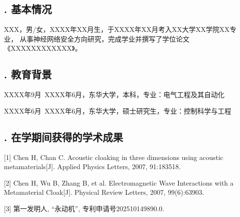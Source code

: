 
\begin{resume}
\subsection*{. 基本情况}

XXX，男/女，XXXX年XX月生，于XXXX年XX月考入XX大学XX学院XX专业，
从事神经网络安全方向研究，完成学业并撰写了学位论文《XXXXXXXXXXXX》。

\subsection*{. 教育背景}

XXXX年9月~XXXX年6月，东华大学，本科，专业：电气工程及其自动化

XXXX年6月~XXXX年6月，东华大学，硕士研究生，专业：控制科学与工程

\subsection*{. 在学期间获得的学术成果}

[1] Chen H, Chan C. Acoustic cloaking in three dimensions using acoustic metamaterials[J]. Applied Physics Letters, 2007, 91:183518.

[2] Chen H, Wu B, Zhang B, et al. Electromagnetic Wave Interactions with a Metamaterial Cloak[J]. Physical Review Letters, 2007, 99(6):63903.
    
[3] 第一发明人, “永动机”, 专利申请号202510149890.0.

\end{resume}
    
